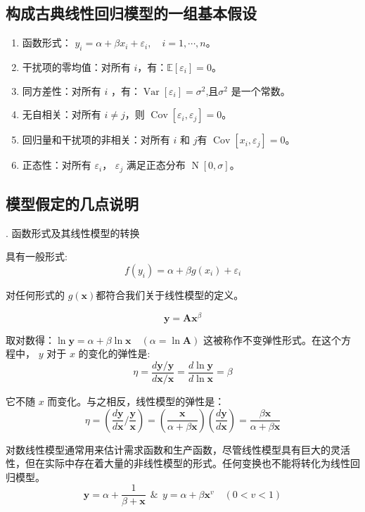 \subsection{构成古典线性回归模型的一组基本假设}
\begin{enumerate}[1)]
    \item 函数形式： $y_{i}=\alpha+\beta x_{i}+\varepsilon_{i}, \quad i=1, \cdots, n$。
    \item 干扰项的零均值：对所有 $i$，有：$\mathbb{E}\left[\varepsilon_{i}\right] = 0 $。
    \item 同方差性：对所有 $i$ ，有：$\operatorname{Var}\left[\varepsilon_{i}\right]=\sigma^{2}$,且$ \sigma^{2}$ 是一个常数。
    \item 无自相关：对所有 $i \neq j$，则 $ \operatorname{Cov}\left[\varepsilon_{i},\varepsilon_{j}\right] = 0 $。
    \item 回归量和干扰项的非相关：对所有 $i$ 和 $j $有 $ \operatorname{Cov}\left[x_{i},\varepsilon_{j}\right] = 0 $。
    \item 正态性：对所有 $\varepsilon_{i}$， $\varepsilon_{j}$ 满足正态分布 $ \operatorname{N}\left[0,\sigma \right]  $。
\end{enumerate}

\subsection{模型假定的几点说明 }

{. 函数形式及其线性模型的转换}

具有一般形式:
$$ f\left(y_{i}\right)=\alpha+\beta g\left(x_{i}\right)+\varepsilon_{i} $$

对任何形式的 $g(\boldsymbol{x})$都符合我们关于线性模型的定义。
\begin{myexample}[一个常用的函数形式是对数线性模型]
    $$ {\boldsymbol{ y }} = \boldsymbol{A} {\boldsymbol{ x} } ^{\beta}$$

    取对数得：$ \ln \boldsymbol{y} =\alpha+\beta \ln \boldsymbol{x} \quad (\alpha=\ln \boldsymbol{A}) $
    这被称作不变弹性形式。在这个方程中， $y$ 对于 $x$ 的变化的弹性是:
    $$ \eta=\frac{d \boldsymbol{y} / \boldsymbol{y}}{d \boldsymbol{x} / \boldsymbol{x}}=\frac{d \ln \boldsymbol{y}}{d \ln \boldsymbol{x}}=\beta $$

    它不随 $x$ 而变化。与之相反，线性模型的弹性是：
    $$\eta=\left(\frac{d \boldsymbol{y}}{d \boldsymbol{x}} / \frac{\boldsymbol{y}}{\boldsymbol{x}}\right)
         =\left(\frac{\boldsymbol{x}}{\alpha+\beta \boldsymbol{x}} \right)\left(\frac{d \boldsymbol{y} }{d \boldsymbol{x}}\right)
         =\frac{\beta \boldsymbol{x}}{\alpha+\beta \boldsymbol{x}}$$

    对数线性模型通常用来估计需求函数和生产函数，尽管线性模型具有巨大的灵活性，但在实际中存在着大量的非线性模型的形式。任何变换也不能将转化为线性回归模型。
    $$ \boldsymbol{y}=\alpha+\frac{1}{\beta+\boldsymbol{x} }  \ \ \&  \ \ y=\alpha+\beta \boldsymbol{x}^{v} \quad(0<v<1)$$
\end{myexample}

